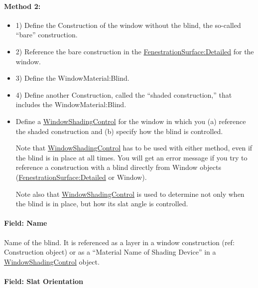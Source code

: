 \paragraph{Method 2:}\label{method-2-1}

\begin{itemize}
\item 1) Define the Construction of the window without the blind, the so-called ``bare'' construction.

\item 2) Reference the bare construction in the \hyperref[fenestrationsurfacedetailed]{FenestrationSurface:Detailed} for the window.

\item 3) Define the WindowMaterial:Blind.

\item 4) Define another Construction, called the ``shaded construction,'' that includes the WindowMaterial:Blind.

\item[5)] Define a \hyperref[windowpropertyshadingcontrol]{WindowShadingControl} for the window in which you (a) reference the shaded construction and (b) specify how the blind is controlled.

Note that \hyperref[windowpropertyshadingcontrol]{WindowShadingControl} has to be used with either method, even if the blind is in place at all times. You will get an error message if you try to reference a construction with a blind directly from Window objects (\hyperref[fenestrationsurfacedetailed]{FenestrationSurface:Detailed} or Window).

Note also that \hyperref[windowpropertyshadingcontrol]{WindowShadingControl} is used to determine not only when the blind is in place, but how its slat angle is controlled.

\end{itemize}

\paragraph{Field: Name}\label{field-name-17-007}

Name of the blind. It is referenced as a layer in a window construction (ref: Construction object) or as a ``Material Name of Shading Device'' in a \hyperref[windowpropertyshadingcontrol]{WindowShadingControl} object.

\paragraph{Field: Slat Orientation}\label{field-slat-orientation}

